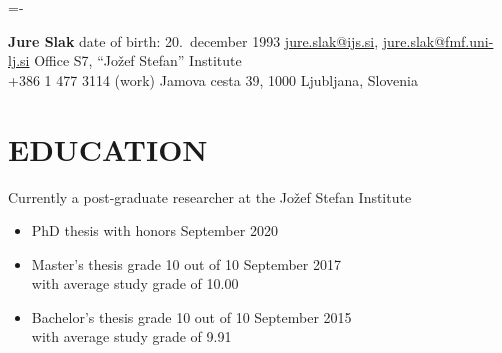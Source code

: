 \documentclass[line,margin]{res}
\newcommand{\wmeta}[1]{\sf#1\rm}
\begin{document}
\leftskip=-\hoffset
\advance\textwidth\hoffset %
\parindent=0pt
\parskip=2pt

{\bf \large Jure Slak} \hfill date of birth: 20.~december 1993
\vskip 2pt
\fullline
\href{mailto:jure.slak@ijs.si}{jure.slak@ijs.si},
\href{mailto:jure.slak@fmf.uni-lj.si}{jure.slak@fmf.uni-lj.si}
\hfill Office S7, ``Jožef Stefan'' Institute   \\
+386 1 477 3114 (work) \hfill Jamova cesta 39, 1000 Ljubljana, Slovenia

\leftskip=0pt
\parskip=12pt

\section{EDUCATION}
\wmeta{Currently a post-graduate researcher at the Jožef Stefan Institute}

\begin{itemize}
  \item PhD thesis with honors  \hfill September 2020
  \item Master's thesis grade 10 out of 10 \hfill September 2017 \\
  with average study grade of 10.00
  \item Bachelor's thesis grade 10 out of 10 \hfill September 2015 \\
  with average study grade of 9.91
\end{itemize}

\end{document}
